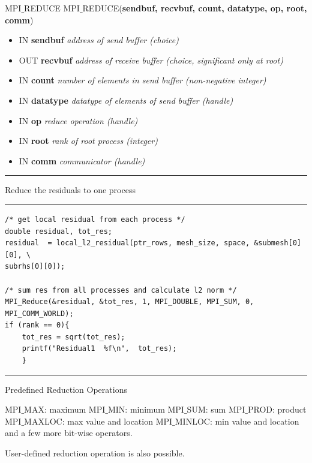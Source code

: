 \documentclass[xcolor=dvipsnames]{beamer}
\begin{document}
\begin{frame}[fragile]{}
\begin{block}{MPI$\_$REDUCE}
MPI$\_$REDUCE(\textbf{sendbuf, recvbuf, count, datatype, op,  root, comm})
\\
\begin{itemize}
\item[] IN \textbf{sendbuf} \: \textit{address of send buffer (choice)}\\
\item[] OUT \textbf{recvbuf} \: \textit{address of receive buffer (choice, significant only at
root)}\\
\item[] IN \textbf{count} \: \textit{number of elements in send buffer (non-negative
integer)}\\
\item[] IN \textbf{datatype} \: \textit{datatype of elements of send buffer (handle)}\\
\item[] IN \textbf{op} \: \textit{reduce operation (handle)}\\
\item[] IN \textbf{root} \: \textit{rank of root process (integer)}\\
\item[] IN \textbf{comm} \: \textit{communicator (handle)}
\end{itemize}
\end{block}
\rule{\textwidth}{1pt}
\end{frame}



\begin{frame}[fragile]{Reduce the residuals to one process}
\rule{\textwidth}{1pt}
\scriptsize
\begin{verbatim}
/* get local residual from each process */
double residual, tot_res;
residual  = local_l2_residual(ptr_rows, mesh_size, space, &submesh[0][0], \
subrhs[0][0]);
    
/* sum res from all processes and calculate l2 norm */
MPI_Reduce(&residual, &tot_res, 1, MPI_DOUBLE, MPI_SUM, 0, MPI_COMM_WORLD);
if (rank == 0){
    tot_res = sqrt(tot_res);
    printf("Residual1  %f\n",  tot_res); 
    }
\end{verbatim}
\rule{\textwidth}{1pt}
\end{frame}

\begin{frame}{Predefined Reduction Operations}
\begin{outline}
\1 MPI$\_$MAX: maximum
\1 MPI$\_$MIN: minimum
\1 MPI$\_$SUM: sum
\1 MPI$\_$PROD: product
\1 MPI$\_$MAXLOC: max value and location
\1 MPI$\_$MINLOC: min value and location
\1 and a few more bit-wise operators.
\end{outline}

User-defined reduction operation is also possible.
\end{frame}
\end{document}
